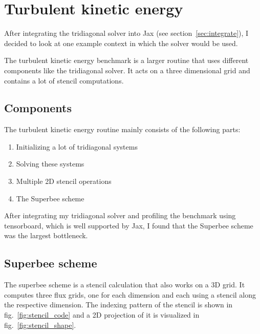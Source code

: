 \documentclass[a4paper,oneside]{memoir}
\begin{document}
\section{Turbulent kinetic energy}
After integrating the tridiagonal solver into Jax (see section~\ref{sec:integrate}), I decided to look at one example context in which the solver would be used.

The turbulent kinetic energy benchmark is a larger routine that uses different components like the tridiagonal solver. It acts on a three dimensional grid and contains a lot of stencil computations. 
\subsection{Components}
The turbulent kinetic energy routine mainly consists of the following parts:
\begin{enumerate}
    \item Initializing a lot of tridiagonal systems
    \item Solving these systems 
    \item Multiple 2D stencil operations
    \item The Superbee scheme
\end{enumerate}
After integrating my tridiagonal solver and profiling the benchmark using tensorboard, which is well supported by Jax, I found that the Superbee scheme was the largest bottleneck.  
\subsection{Superbee scheme}
The superbee scheme is a stencil calculation that also works on a 3D grid. It computes three flux grids, one for each dimension and each using a stencil along the respective dimension. 
The indexing pattern of the stencil is shown in fig.~\ref{fig:stencil_code} and a 2D projection of it is visualized in fig.~\ref{fig:stencil_shape}. 
\end{document}
